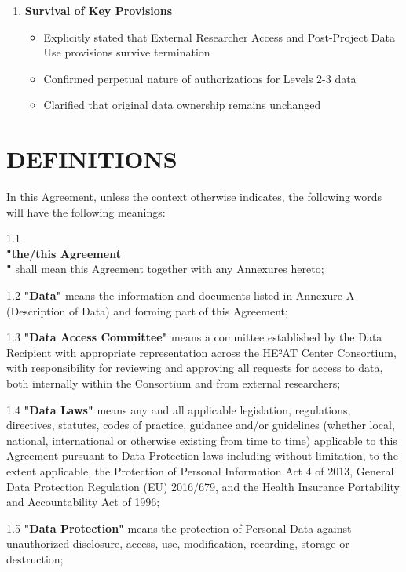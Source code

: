 \documentclass[12pt,letterpaper]{article}
\begin{document}
\begin{enumerate}
\item \textbf{Survival of Key Provisions}
   \begin{itemize}
   \item Explicitly stated that External Researcher Access and Post-Project Data Use provisions survive termination
   \item Confirmed perpetual nature of authorizations for Levels 2-3 data
   \item Clarified that original data ownership remains unchanged
   \end{itemize}
\end{enumerate}

\pagebreak

\section{DEFINITIONS}

In this Agreement, unless the context otherwise indicates, the following words will have the following meanings:

1.1 \textbf{\\"the/this Agreement\\"} shall mean this Agreement together with any Annexures hereto;

1.2 \textbf{"Data"} means the information and documents listed in Annexure A (Description of Data) and forming part of this Agreement;

1.3 \textbf{"Data Access Committee"} means a committee established by the Data Recipient with appropriate representation across the HE²AT Center Consortium, with responsibility for reviewing and approving all requests for access to data, both internally within the Consortium and from external researchers;

1.4 \textbf{"Data Laws"} means any and all applicable legislation, regulations, directives, statutes, codes of practice, guidance and/or guidelines (whether local, national, international or otherwise existing from time to time) applicable to this Agreement pursuant to Data Protection laws including without limitation, to the extent applicable, the Protection of Personal Information Act 4 of 2013, General Data Protection Regulation (EU) 2016/679, and the Health Insurance Portability and Accountability Act of 1996;

1.5 \textbf{"Data Protection"} means the protection of Personal Data against unauthorized disclosure, access, use, modification, recording, storage or destruction;
\end{document}
